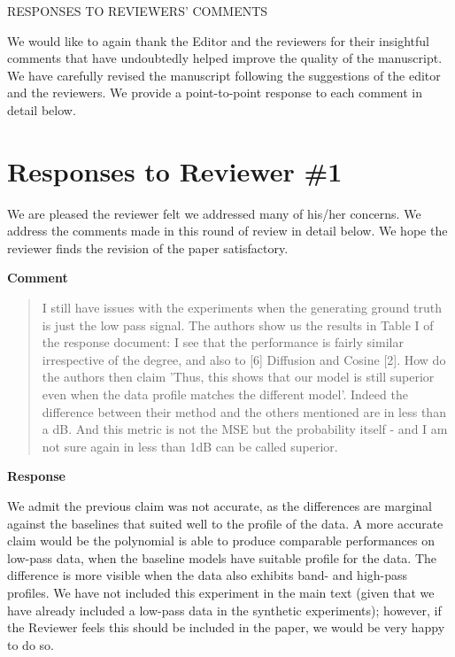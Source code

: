 \documentclass[11pt,onecolumn,journal]{IEEEtran}
\begin{document}
\begin{center}
\large RESPONSES TO REVIEWERS' COMMENTS
\end{center}
We would like to again thank the Editor and the reviewers for their insightful comments that have undoubtedly helped improve the quality of the manuscript. We have carefully revised the manuscript following the suggestions of the editor and the reviewers. We provide a point-to-point response to each comment in detail below.

\section*{Responses to Reviewer \#1}

We are pleased the reviewer felt we addressed many of his/her concerns. We address the comments made in this round of review in detail below. We hope the reviewer finds the revision of the paper satisfactory.

\textbf{Comment}

\begin{quote}
    I still have issues with the experiments when the generating ground truth is just the low pass signal. The authors show us the results in Table I of the response document: I see that the performance is fairly similar irrespective of the degree, and also to [6] Diffusion and Cosine [2]. How do the authors then claim 'Thus, this shows that our model is still superior even when the data profile
    matches the different model'. Indeed the difference between their method and the others mentioned are in less than a dB. And this metric is not the MSE but the probability itself - and I am not sure again in less than 1dB can be called superior.
\end{quote}

\textbf{Response}

We admit the previous claim was not accurate, as the differences are marginal against the baselines that suited well to the profile of the data. A more accurate claim would be the polynomial is able to produce comparable performances on low-pass data, when the baseline models have suitable profile for the data. The difference is more visible when the data also exhibits band- and high-pass profiles. We have not included this experiment in the main text (given that we have already included a low-pass data in the synthetic experiments); however, if the Reviewer feels this should be included in the paper, we would be very happy to do so.
\end{document}
